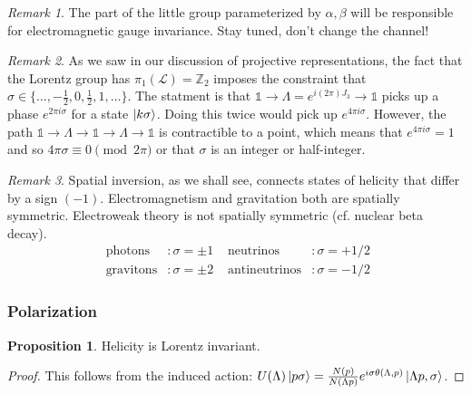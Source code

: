 \documentclass[10pt]{article}
\newcommand{\iden}{\mathds{1}}
\newcommand{\bZ}{\mathbb Z}
\newcommand{\ms}{\mathscr}
\newcommand{\sg}{\sigma}
\newcommand{\FR}[2]{\frac{#1}{#2}}
\theoremstyle{plain}
\theoremstyle{definition}
\newtheorem{prop}{Proposition}
\theoremstyle{remark}
\newtheorem*{remark}{Remark}
\begin{document}
\begin{remark} The part of the little group parameterized by
$\alpha,\beta$ will be responsible for electromagnetic gauge
invariance. Stay tuned, don't change the channel!
\end{remark}

\begin{remark} As we saw in our discussion of projective
representations, the fact that the Lorentz group has $\pi_1(\ms L)
= \bZ_2$ imposes the constraint that
$\sg\in\{\dots,-\FR{1}{2},0,\FR{1}{2},1,\dots\}$.  The statment is
that $\iden\to\Lambda=e^{i(2\pi)J_3} \to\iden$ picks up a phase
$e^{2\pi i\sg}$ for a state $\ket{k\sg}$. Doing this twice would pick
up $e^{4\pi i \sg}$. However, the path $\iden\to\Lambda\to \iden \to
\Lambda \to\iden$ is contractible to a point, which means that
$e^{4\pi i\sg}=1$ and so $4\pi\sg\equiv 0 \pmod{2\pi}$ or that $\sg$
is an integer or half-integer.  
\end{remark}

\begin{remark}
    Spatial inversion, as we shall see, connects states of helicity
    that differ by a sign $(-1)$. Electromagnetism and gravitation
    both are spatially symmetric. Electroweak theory is not spatially
    symmetric (cf. nuclear beta decay).
    \begin{align*}
        \text{ photons}&: \sg = \pm1 &
      \text{ neutrinos}&: \sg = +1/2\\
      \text{ gravitons}&: \sg = \pm2&
  \text{ antineutrinos}&: \sg = -1/2
    \end{align*}
\end{remark}

\subsubsection{Polarization}

\begin{prop} Helicity is Lorentz invariant.
\end{prop}
\begin{proof} This follows from the induced action:
$U(\Lambda)\ket{p\sg} = \FR{N(p)}{N(\Lambda p)} 
e^{i\sg\theta(\Lambda,p)}\ket{\Lambda p,\sg}$.
\end{proof}
\end{document}
